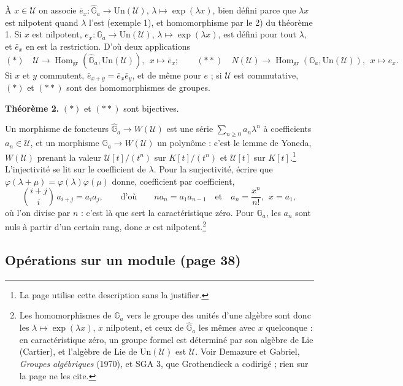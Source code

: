 \documentclass[11pt,a4paper]{article}
\begin{document}
À $x \in \mathcal{U}$ on associe $\bar e_x : \widehat{\mathbb{G}}_a \to
\mathrm{Un}(\mathcal{U})$, $\lambda \mapsto \exp(\lambda x)$, bien défini
parce que $\lambda x$ est nilpotent quand $\lambda$ l'est (exemple 1), et
homomorphisme par le 2) du théorème 1. Si $x$ est nilpotent,
$e_x : \mathbb{G}_a \to \mathrm{Un}(\mathcal{U})$,
$\lambda \mapsto \exp(\lambda x)$, est défini pour tout $\lambda$, et
$\bar e_x$ en est la restriction. D'où deux applications
\[
(*)\quad \mathcal{U} \to
\operatorname{Hom}_{\mathrm{gr}}(\widehat{\mathbb{G}}_a, \mathrm{Un}(\mathcal{U})),
\ \ x \mapsto \bar e_x ;
\qquad
(**)\quad N(\mathcal{U}) \to
\operatorname{Hom}_{\mathrm{gr}}(\mathbb{G}_a, \mathrm{Un}(\mathcal{U})),
\ \ x \mapsto e_x .
\]
Si $x$ et $y$ commutent, $\bar e_{x+y} = \bar e_x \bar e_y$, et de même pour
$e$ ; si $\mathcal{U}$ est commutative, $(*)$ et $(**)$ sont des
homomorphismes de groupes.

\textbf{Théorème 2.} $(*)$ et $(**)$ sont bijectives.

Un morphisme de foncteurs $\widehat{\mathbb{G}}_a \to W(\mathcal{U})$ est une
série $\sum_{n \geqslant 0} a_n \lambda^n$ à coefficients $a_n \in
\mathcal{U}$, et un morphisme $\mathbb{G}_a \to W(\mathcal{U})$ un polynôme :
c'est le lemme de Yoneda, $W(\mathcal{U})$ prenant la valeur
$\mathcal{U}[t]/(t^n)$ sur $K[t]/(t^n)$ et $\mathcal{U}[t]$ sur
$K[t]$.\footnote{La page utilise cette description sans la justifier.}
L'injectivité se lit sur le coefficient de $\lambda$. Pour la surjectivité,
écrire que $\varphi(\lambda + \mu) = \varphi(\lambda)\varphi(\mu)$ donne,
coefficient par coefficient,
\[
\binom{i + j}{i}\, a_{i+j} = a_i a_j ,
\qquad\text{d'où}\qquad
n a_n = a_1 a_{n-1}
\quad\text{et}\quad
a_n = \frac{x^n}{n!},\ \ x = a_1 ,
\]
où l'on divise par $n$ : c'est là que sert la caractéristique zéro. Pour
$\mathbb{G}_a$, les $a_n$ sont nuls à partir d'un certain rang, donc $x$ est
nilpotent.\footnote{Les homomorphismes de $\mathbb{G}_a$ vers le groupe des
unités d'une algèbre sont donc les $\lambda \mapsto \exp(\lambda x)$, $x$
nilpotent, et ceux de $\widehat{\mathbb{G}}_a$ les mêmes avec $x$
quelconque : en caractéristique zéro, un groupe formel est déterminé par son
algèbre de Lie (Cartier), et l'algèbre de Lie de $\mathrm{Un}(\mathcal{U})$
est $\mathcal{U}$. Voir Demazure et Gabriel, \emph{Groupes algébriques}
(1970), et SGA 3, que Grothendieck a codirigé ; rien sur la page ne les
cite.}

\subsection*{Opérations sur un module (page 38)}
\end{document}
